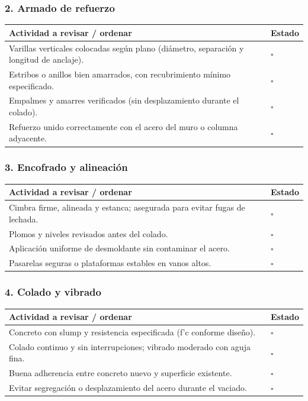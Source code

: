\documentclass[12pt]{article}
\newcommand{\cbox}{\(\square\)} %
\begin{document}
	\subsubsection*{2. Armado de refuerzo}
	\begin{tabularx}{\linewidth}{>{\raggedright\arraybackslash}p{0.93\linewidth} >{\centering\arraybackslash}m{0.07\linewidth}}
		\toprule
		\textbf{Actividad a revisar / ordenar} & \textbf{Estado}\\
		\midrule
		Varillas verticales colocadas según plano (diámetro, separación y longitud de anclaje). & \cbox \\
		Estribos o anillos bien amarrados, con recubrimiento mínimo especificado. & \cbox \\
		Empalmes y amarres verificados (sin desplazamiento durante el colado). & \cbox \\
		Refuerzo unido correctamente con el acero del muro o columna adyacente. & \cbox \\
		\bottomrule
	\end{tabularx}
	
	\subsubsection*{3. Encofrado y alineación}
	\begin{tabularx}{\linewidth}{>{\raggedright\arraybackslash}p{0.93\linewidth} >{\centering\arraybackslash}m{0.07\linewidth}}
		\toprule
		\textbf{Actividad a revisar / ordenar} & \textbf{Estado}\\
		\midrule
		Cimbra firme, alineada y estanca; asegurada para evitar fugas de lechada. & \cbox \\
		Plomos y niveles revisados antes del colado. & \cbox \\
		Aplicación uniforme de desmoldante sin contaminar el acero. & \cbox \\
		Pasarelas seguras o plataformas estables en vanos altos. & \cbox \\
		\bottomrule
	\end{tabularx}
	
	\subsubsection*{4. Colado y vibrado}
	\begin{tabularx}{\linewidth}{>{\raggedright\arraybackslash}p{0.93\linewidth} >{\centering\arraybackslash}m{0.07\linewidth}}
		\toprule
		\textbf{Actividad a revisar / ordenar} & \textbf{Estado}\\
		\midrule
		Concreto con slump y resistencia especificada (f’c conforme diseño). & \cbox \\
		Colado continuo y sin interrupciones; vibrado moderado con aguja fina. & \cbox \\
		Buena adherencia entre concreto nuevo y superficie existente. & \cbox \\
		Evitar segregación o desplazamiento del acero durante el vaciado. & \cbox \\
		\bottomrule
	\end{tabularx}
	
\end{document}
